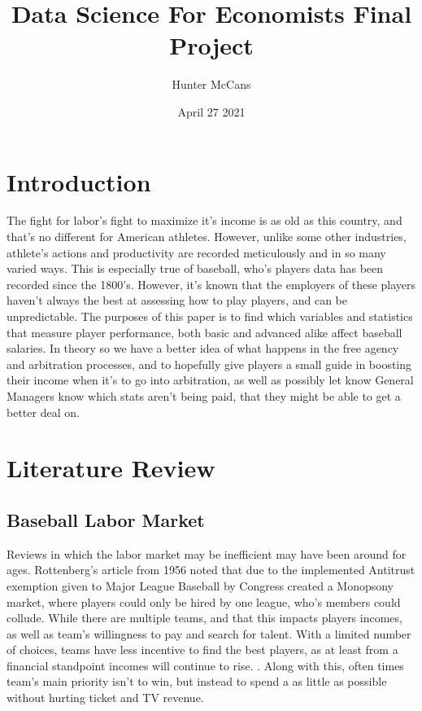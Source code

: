 \documentclass{article}
\title{Data Science For Economists Final Project}
\author{Hunter McCans}
\date{April 27 2021}
\begin{document}
\maketitle
\pagebreak


\doublespacing
\section{Introduction}

The fight for labor's fight to maximize it's income is as old as this country, and that's no different for American athletes. However, unlike some other industries, athlete's actions and productivity are recorded meticulously and in so many varied ways. This is especially true of baseball, who's players data has been recorded since the 1800's. However, it's known that the employers of these players haven't always the best at assessing how to play players, and can be unpredictable. The purposes of this paper is to find which variables and statistics that measure player performance, both basic and advanced alike affect baseball salaries. In theory so we have a better idea of what happens in the free agency and arbitration processes, and to hopefully give players a small guide in boosting their income when it's to go into arbitration, as well as possibly let know General Managers know which stats aren't being paid, that they might be able to get a better deal on.

\section{Literature Review}


\subsection{Baseball Labor Market}
Reviews in which the labor market may be inefficient may have been around for ages. Rottenberg's article from 1956 noted that due to the implemented Antitrust exemption given to Major League Baseball by Congress created a Monopsony market, where players could only be hired by one league, who's members could collude. While there are multiple teams, and that this impacts players incomes, as well as team's willingness to pay and search for talent. With a limited number of choices, teams have less incentive to find the best players, as at least from a financial standpoint incomes will continue to rise. \citet{1956labor}. Along with this, often times team's main priority isn't to win, but instead to spend a as little as possible without hurting ticket and TV revenue. 
\end{document}
